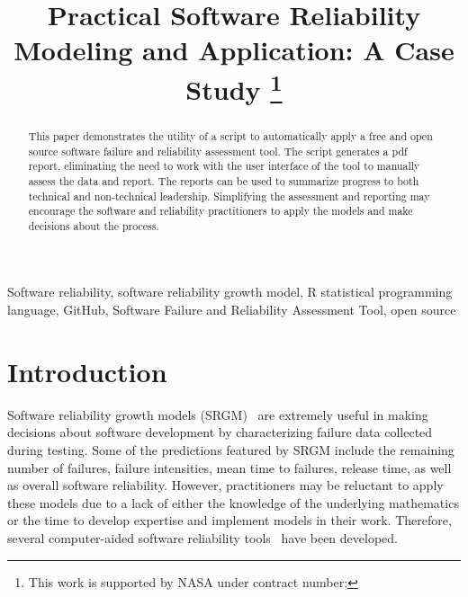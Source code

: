 \documentclass[conference]{IEEEtran}
\begin{document}
\title{Practical Software Reliability Modeling and Application: A Case Study
\thanks{This work is supported by NASA under contract number: }
}



\author{
\and
{}
}

\maketitle

\begin{abstract}
This paper demonstrates the utility of a script to automatically apply a free and open source software failure and reliability assessment tool. The script generates a pdf report, eliminating the need to work with the user interface of the tool to manually assess the data and report. The reports can be used to summarize progress to both technical and non-technical leadership. Simplifying the assessment and reporting may encourage the software and reliability practitioners to apply the models and make decisions about the process.
\end{abstract}

\begin{IEEEkeywords}
Software reliability, software reliability growth model, R statistical programming language, GitHub, Software Failure and Reliability Assessment Tool, open source
\end{IEEEkeywords}


\section{Introduction}\label{sec:Intro}
Software reliability growth models (SRGM)~\cite{BookHoSRE} are extremely useful in making decisions about software development by characterizing failure data collected during testing. Some of the predictions featured by SRGM include the remaining number of failures, failure intensities, mean time to failures, release time, as well as overall software reliability. However, practitioners may be reluctant to apply these models due to a lack of either the knowledge of the underlying mathematics or the time to develop expertise and implement models in their work. Therefore, several computer-aided software reliability tools~\cite{trSMERFS,inProcISSRE2013_100,lyu1992casre} have been developed.
\end{document}
